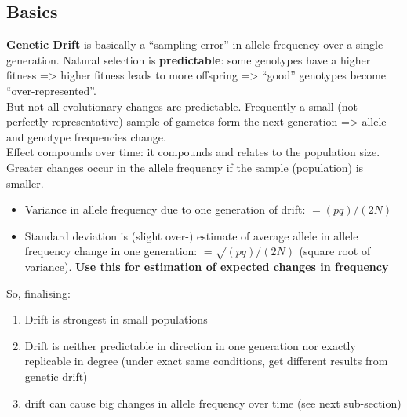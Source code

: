\documentclass{scrartcl}
\begin{document}
\subsection{Basics}
\label{sec:07-04-01}
{\bf Genetic Drift} is basically a ``sampling error'' in allele frequency over a single generation. Natural selection is {\bf predictable}: some genotypes have a higher fitness => higher fitness leads to more offspring => ``good'' genotypes become ``over-represented''.\\
But not all evolutionary changes are predictable.
Frequently a small (not-perfectly-representative) sample of gametes form the next generation => allele and genotype frequencies change.\\
Effect compounds over time: it compounds and relates to the population size. Greater changes occur in the allele frequency if the sample (population) is smaller.
\begin{itemize}
\item Variance in allele frequency due to one generation of drift: $=(pq)/(2N)$
\item Standard deviation is (slight over-) estimate of average allele in allele frequency change in one generation: $=\sqrt{(pq)/(2N)}$ (square root of variance).
{\bf Use this for estimation of expected changes in frequency}
\end{itemize}
So, finalising:
\begin{enumerate}
\item Drift is strongest in small populations
\item Drift is neither predictable in direction in one generation nor exactly replicable in degree (under exact same conditions, get different results from genetic drift)
\item drift can cause big changes in allele frequency over time (see next sub-section)
\end{enumerate}

\end{document}

